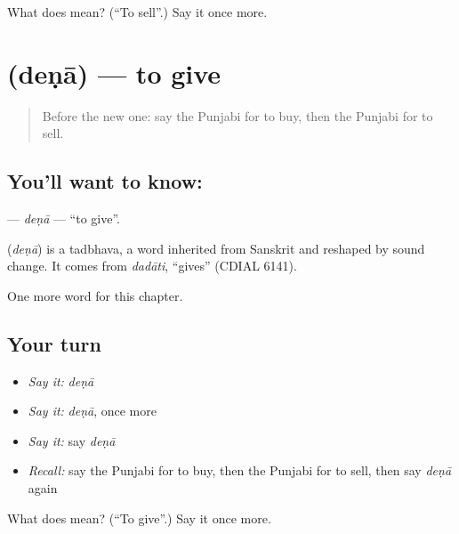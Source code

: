 \begin{tcolorbox}[breakable,colback=teal!4,colframe=teal!35!black,title={Before you move on}]
What does  mean? (\textquotedblleft{}To sell\textquotedblright{}.) Say it once more.
\end{tcolorbox}
\section[\texorpdfstring{\pa{ਦੇਣਾ} (deṇā)}{ਦੇਣਾ (deṇā)}]{ (deṇā) — to give}

\label{lesson:PA-C58-dena}



\begin{quote}
Before the new one: say the Punjabi for to buy, then the Punjabi for to sell.
\end{quote}

\subsection*{You'll want to know: }
\textbf{} — \emph{deṇā} — \textquotedblleft{}to give\textquotedblright{}.

\begin{cousinweb}
\textbf{} (\emph{deṇā}) is a tadbhava, a word inherited from Sanskrit and reshaped by sound change. It comes from \emph{dadāti}, \textquotedblleft{}gives\textquotedblright{} (CDIAL 6141).
\end{cousinweb}

\begin{grammarlens}[title={What you've built}]
One more word for this chapter.
\end{grammarlens}

\subsection*{Your turn}
\begin{itemize}
\raggedright
  \item \emph{Say it:} \emph{deṇā}
  \item \emph{Say it:} \emph{deṇā}, once more
  \item \emph{Say it:} say \emph{deṇā}
  \item \emph{Recall:} say the Punjabi for to buy, then the Punjabi for to sell, then say \emph{deṇā} again
\end{itemize}

\begin{tcolorbox}[breakable,colback=teal!4,colframe=teal!35!black,title={Before you move on}]
What does  mean? (\textquotedblleft{}To give\textquotedblright{}.) Say it once more.
\end{tcolorbox}
